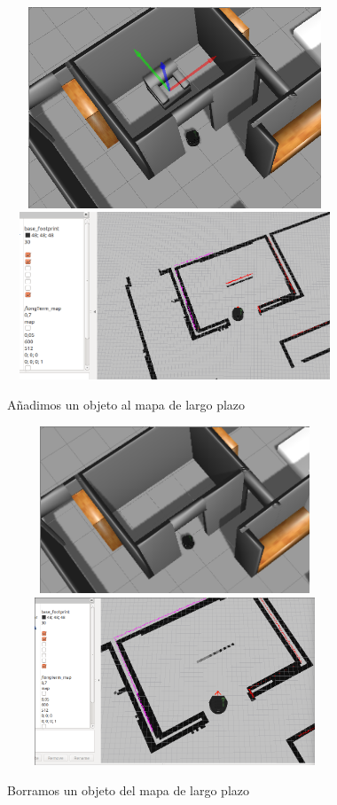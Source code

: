 \begin{figure}[H]
  \begin{center}
    \includegraphics[width=10cm,height=6cm]{img/cap5/addingobject-gazebo}
    \includegraphics[width=10cm,height=5cm]{img/cap5/addingobject-longmap}
  \end{center}
  \caption{Añadimos un objeto al mapa de largo plazo}
  \label{fig:addobjectlongmap}
\end{figure}

\begin{figure}[H]
  \begin{center}
    \includegraphics[width=10cm,height=5cm]{img/cap5/deletingobject-gazebo}
    \includegraphics[width=10cm,height=5cm]{img/cap5/deletingobject-longmap}
  \end{center}
  \caption{Borramos un objeto del mapa de largo plazo}
  \label{fig:deleteobjectlongmap}
\end{figure}


